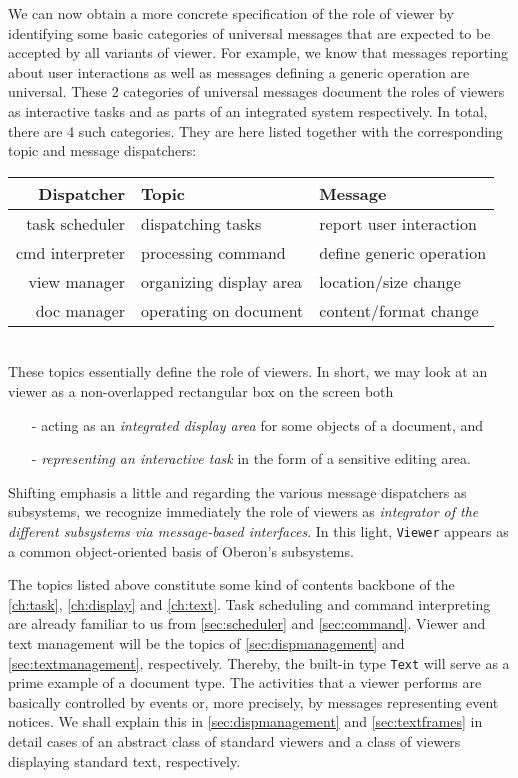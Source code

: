 We can now obtain a more concrete specification of the role of viewer
by identifying some basic categories of universal messages
that are expected to be accepted by all variants of viewer.
For example, we know that messages reporting about user interactions
as well as messages defining a generic operation are universal.
These 2 categories of universal messages document the roles of viewers as interactive tasks
and as parts of an integrated system respectively.
In total, there are 4 such categories.
They are here listed together with the corresponding topic and message dispatchers:
\begin{table}[h!]
  \setlength{\tabcolsep}{3pt}
  \begin{tabular}{r|l|l}
    Dispatcher               &Topic
                             &Message \\\hline
    {\small  task scheduler} &{\small dispatching tasks}
                             &{\small report user interaction }\\
    {\small cmd interpreter} &{\small processing command}
                             &{\small define generic operation}\\
    {\small    view manager} &{\small organizing display area}
                             &{\small location/size change}\\
    {\small     doc manager} &{\small operating on document}
                             &{\small content/format change}
  \end{tabular}
\end{table}
\\These topics essentially define the role of viewers.
In short, we may look at an viewer as a non-overlapped rectangular box on the screen both
\begin{itemize}
  \item[-] acting as an \emph{integrated display area} for some objects of a document, and
  \item[-] \emph{representing an interactive task} in the form of a sensitive editing area.
\end{itemize}

Shifting emphasis a little and regarding the various message dispatchers as subsystems,
we recognize immediately the role of viewers as \emph{integrator of the different subsystems
via message-based interfaces}.  In this light,
\verb|Viewer| appears as a common object-oriented basis of Oberon's subsystems.

The topics listed above constitute some kind of contents backbone of the \ref{ch:task},
\ref{ch:display} and \ref{ch:text}.  Task scheduling and command interpreting
are already familiar to us from \textsection \ref{sec:scheduler} and \ref{sec:command}.
Viewer and text management will be the topics of \textsection \ref{sec:dispmanagement}
and \ref{sec:textmanagement}, respectively.  Thereby, the built-in type \verb|Text|
will serve as a prime example of a document type.  The activities that a viewer performs
are basically controlled by events or, more precisely, by messages representing event notices.
We shall explain this in \textsection \ref{sec:dispmanagement} and \ref{sec:textframes}
in detail cases of an abstract class of standard viewers and
a class of viewers displaying standard text, respectively.

